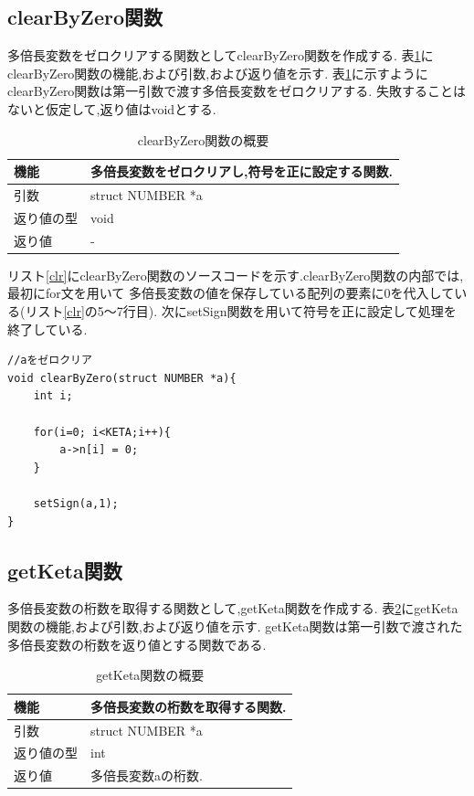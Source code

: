 \documentclass[a4j] {jarticle}
\begin{document}
\subsection{clearByZero関数}
  多倍長変数をゼロクリアする関数としてclearByZero関数を作成する.
表\ref{clearByZero}にclearByZero関数の機能,および引数,および返り値を示す.
表\ref{clearByZero}に示すようにclearByZero関数は第一引数で渡す多倍長変数をゼロクリアする.
失敗することはないと仮定して,返り値はvoidとする.
\begin{table}[H]
  \caption{clearByZero関数の概要}
  \label{clearByZero}
  \begin{center}
      \begin{tabular}{|l|l|}\hline
      機能 & 多倍長変数をゼロクリアし,符号を正に設定する関数.\\ \hline
      引数 & struct NUMBER *a\\ \hline
      返り値の型 & void\\ \hline
      返り値 & -\\ \hline
      \end{tabular}
  \end{center}
  \end{table}

  リスト\ref{clr}にclearByZero関数のソースコードを示す.clearByZero関数の内部では,最初にfor文を用いて
  多倍長変数の値を保存している配列の要素に0を代入している(リスト\ref{clr}の5～7行目).
  次にsetSign関数を用いて符号を正に設定して処理を終了している.

  \begin{lstlisting}[basicstyle=\ttfamily\footnotesize, frame=single,label=clr,caption=clearByZero関数のソースコード]
//aをゼロクリア
void clearByZero(struct NUMBER *a){
    int i;

    for(i=0; i<KETA;i++){
        a->n[i] = 0;
    }

    setSign(a,1);
}
  \end{lstlisting}

\subsection{getKeta関数}
多倍長変数の桁数を取得する関数として,getKeta関数を作成する.
表\ref{getKeta}にgetKeta関数の機能,および引数,および返り値を示す.
getKeta関数は第一引数で渡された多倍長変数の桁数を返り値とする関数である.
\begin{table}[H]
  \caption{getKeta関数の概要}
  \label{getKeta}
  \begin{center}
      \begin{tabular}{|l|l|}\hline
      機能 & 多倍長変数の桁数を取得する関数.\\ \hline
      引数 & struct NUMBER *a\\ \hline
      返り値の型 & int\\ \hline
      返り値 & 多倍長変数aの桁数.\\ \hline
      \end{tabular}
  \end{center}
  \end{table}
\end{document}
